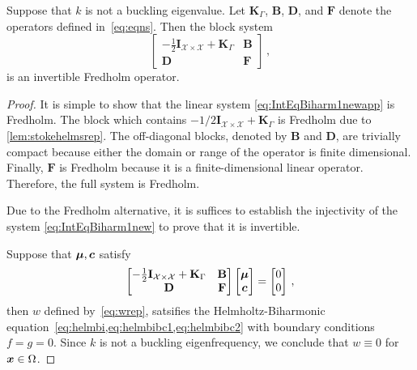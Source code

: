 \begin{lem}
Suppose that $k$ is not a buckling eigenvalue. 
Let $\mathbf{K}_{\Gamma}$, $\mathbf{B}$, $\mathbf{D}$, 
and $\mathbf{F}$ denote the operators defined in~\cref{eq:eqns}.
Then the block system
\begin{equation}
\begin{bmatrix}
-\frac{1}{2}\mathbf{I}_{\mathcal{X}\times\mathcal{X}} + 
\mathbf{K}_{\Gamma} & \mathbf{B} \\
\mathbf{D} & \mathbf{F} 
\end{bmatrix} \, ,
\label{eq:IntEqBiharm1newapp}
\end{equation}
is an invertible Fredholm operator.
\end{lem}
\begin{proof}
It is simple to
show that the linear system \cref{eq:IntEqBiharm1newapp}
is Fredholm. The block which contains
$-1/2 \mathbf{I}_{\mathcal{X}\times\mathcal{X}}
+ \mathbf{K}_\Gamma$ is Fredholm due to 
\cref{lem:stokehelmsrep}. 
The off-diagonal blocks,
denoted by $\mathbf{B}$ and $\mathbf{D}$, 
are trivially compact because either the domain 
or range of the operator is finite dimensional. 
Finally, $\mathbf{F}$ is 
Fredholm because it is a finite-dimensional linear
operator. 
Therefore, the full system is Fredholm.

Due to the Fredholm alternative,
it is suffices to establish the injectivity of
the system \cref{eq:IntEqBiharm1new} to prove that 
it is invertible.

Suppose that ${\boldsymbol \mu},{\boldsymbol c}$ satisfy
\begin{equation}
\begin{bmatrix}
-\frac{1}{2}\mathbf{I}_{\mathcal{X}\times\mathcal{X}} + 
\mathbf{K}_{\Gamma} & \mathbf{B} \\
\mathbf{D} & \mathbf{F} 
\end{bmatrix}  
\begin{bmatrix}
{\boldsymbol \mu} \\
{\boldsymbol c}
\end{bmatrix}
=
\begin{bmatrix}
0 \\ 0
\end{bmatrix} \, ,
\label{eq:IntEqBiharm1newapp2}
\end{equation}
then $w$ defined by~\cref{eq:wrep}, satsifies the Helmholtz-Biharmonic
equation~\cref{eq:helmbi,eq:helmbibc1,eq:helmbibc2} 
with boundary conditions $f=g=0$.
Since $k$ is not a buckling eigenfrequency, we conclude that $w\equiv 0$ 
for ${\boldsymbol x} \in \Omega$.



\end{proof}
